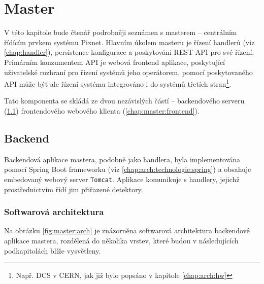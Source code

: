 

\chapter{Master}\label{chap:master}
V této kapitole bude čtenář podrobněji seznámen s masterem -- centrálním řídícím prvkem systému Pixnet. Hlavním úkolem masteru je řízení handlerů (viz \ref{chap:handler}), persistence konfigurace a poskytování REST API pro své řízení. Primárním konzumentem API je webová frontend aplikace, poskytující uživatelské rozhraní pro řízení systémů jeho operátorem, pomocí poskytovaného API může být ale řízení systému integrováno i do systémů třetích stran\footnote{Např. DCS v CERN, jak již bylo popsáno v kapitole \ref{chap:arch:hw}}.

Tato komponenta se skládá ze dvou nezávislých částí -- backendového serveru (\ref{chap:master:backend}) frontendového webového klienta (\ref{chap:master:frontend}).

\section{Backend}\label{chap:master:backend}
Backendová aplikace mastera, podobně jako handlera, byla implementována pomocí Spring Boot frameworku (viz \ref{chap:arch:technologie:spring}) a obsahuje embedovaný webový server \texttt{Tomcat}. Aplikace komunikuje s handlery, jejichž prostřednictvím řídí jim přiřazené detektory.

\subsection{Softwarová architektura}\label{chap:master:backend:sw_arch}
Na obrázku \ref{fig:master:arch} je znázorněna softwarová architektura backendové aplikace mastera, rozdělená do několika vrstev, které budou v následujících podkapitolách blíže vysvětleny.


